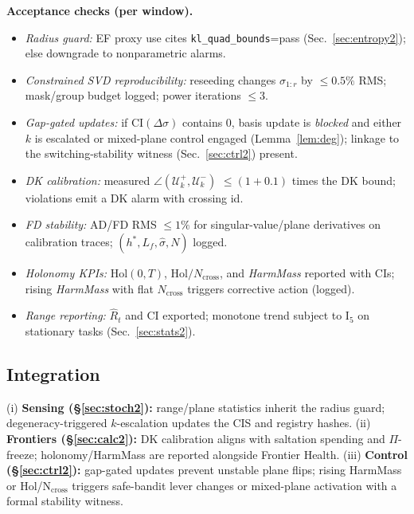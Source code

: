 \begin{mdframed}
\textbf{Acceptance checks (per window).}
\begin{itemize}[leftmargin=*]
\item \emph{Radius guard:} EF proxy use cites \texttt{kl\_quad\_bounds}=\textsf{pass} (Sec.~\ref{sec:entropy2}); else downgrade to nonparametric alarms.
\item \emph{Constrained SVD reproducibility:} reseeding changes $\sigma_{1:r}$ by $\le 0.5\%$ RMS; mask/group budget logged; power iterations $\le 3$.
\item \emph{Gap-gated updates:} if CI$(\Delta\sigma)$ contains $0$, basis update is \emph{blocked} and either $k$ is escalated or mixed-plane control engaged (Lemma~\ref{lem:deg}); linkage to the switching-stability witness (Sec.~\ref{sec:ctrl2}) present.
\item \emph{DK calibration:} measured $\angle(\mathcal U_k^+,\mathcal U_k^-)$ $\le (1{+}0.1)$ times the DK bound; violations emit a DK alarm with crossing id.
\item \emph{FD stability:} AD/FD RMS $\le 1\%$ for singular-value/plane derivatives on calibration traces; $(h^\ast,L_f,\hat\sigma,N)$ logged.
\item \emph{Holonomy KPIs:} $\mathrm{Hol}(0,T)$, $\mathrm{Hol}/N_{\mathrm{cross}}$, and \emph{HarmMass} reported with CIs; rising \emph{HarmMass} with flat $N_{\mathrm{cross}}$ triggers corrective action (logged).
\item \emph{Range reporting:} $\widehat R_t$ and CI exported; monotone trend subject to I$_5$ on stationary tasks (Sec.~\ref{sec:stats2}).
\end{itemize}
\end{mdframed}

\subsection*{Integration}
\noindent
(i) \textbf{Sensing (\S\ref{sec:stoch2}):} range/plane statistics inherit the radius guard; degeneracy-triggered $k$-escalation updates the CIS and registry hashes.
(ii) \textbf{Frontiers (\S\ref{sec:calc2}):} DK calibration aligns with saltation spending and $\Pi$-freeze; holonomy/HarmMass are reported alongside Frontier Health.
(iii) \textbf{Control (\S\ref{sec:ctrl2}):} gap-gated updates prevent unstable plane flips; rising HarmMass or Hol/N$_{\mathrm{cross}}$ triggers safe-bandit lever changes or mixed-plane activation with a formal stability witness.
